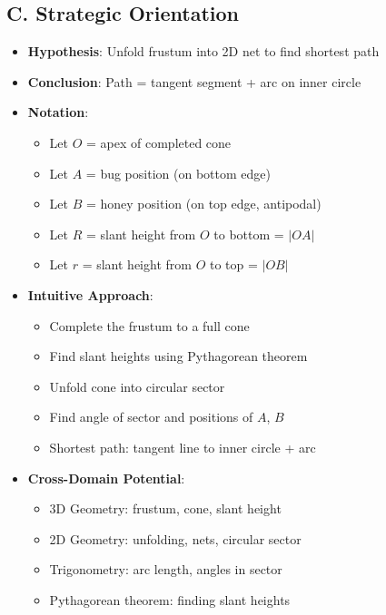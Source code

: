 \documentclass[12pt]{article}
\begin{document}
\begin{problemconfigbox}
\subsection*{C. Strategic Orientation}
\begin{itemize}[leftmargin=*]
    \item \textbf{Hypothesis}: Unfold frustum into 2D net to find shortest path
    \item \textbf{Conclusion}: Path = tangent segment + arc on inner circle
    \item \textbf{Notation}: 
    \begin{itemize}
        \item Let $O$ = apex of completed cone
        \item Let $A$ = bug position (on bottom edge)
        \item Let $B$ = honey position (on top edge, antipodal)
        \item Let $R$ = slant height from $O$ to bottom = $|OA|$
        \item Let $r$ = slant height from $O$ to top = $|OB|$
    \end{itemize}
    \item \textbf{Intuitive Approach}: 
    \begin{itemize}
        \item Complete the frustum to a full cone
        \item Find slant heights using Pythagorean theorem
        \item Unfold cone into circular sector
        \item Find angle of sector and positions of $A$, $B$
        \item Shortest path: tangent line to inner circle + arc
    \end{itemize}
    \item \textbf{Cross-Domain Potential}: 
    \begin{itemize}
        \item 3D Geometry: frustum, cone, slant height
        \item 2D Geometry: unfolding, nets, circular sector
        \item Trigonometry: arc length, angles in sector
        \item Pythagorean theorem: finding slant heights
    \end{itemize}
\end{itemize}
\end{problemconfigbox}
\end{document}
